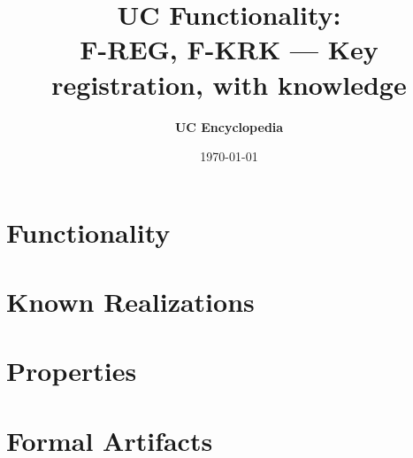 \documentclass[11pt,a4paper]{article}
\title{\textbf{\Large UC Functionality:}\\[0.2em] \Large F-REG, F-KRK --- Key registration, with knowledge}
\author{\textbf{UC Encyclopedia}}
\date{\today}
\newtheorem{functionality}{Functionality}
\begin{document}
\maketitle

\begin{abstract}
\end{abstract}

\section{Functionality}

%

\section{Known Realizations}


\section{Properties}


\section{Formal Artifacts}

\end{document}
